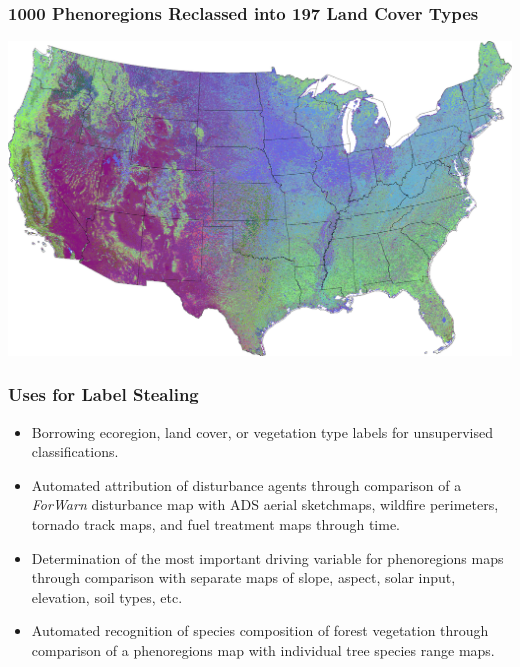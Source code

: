 \begin{frame}
 \frametitle{1000 Phenoregions Reclassed into 197 Land Cover Types}
 \includegraphics[width=\textwidth]{figures/phendump.2000-2012.1000.maxmode.reclassed_level2.simcolor_gimp.pdf}
\end{frame}


\begin{frame}
 \frametitle{Uses for Label Stealing}
 \begin{itemize}
  \item Borrowing ecoregion, land cover, or vegetation type labels for unsupervised classifications.
  \item Automated attribution of disturbance agents through comparison of a \textit{ForWarn} disturbance map with ADS aerial sketchmaps, wildfire perimeters, tornado track maps, and fuel treatment maps through time.
  \item Determination of the most important driving variable for phenoregions maps through comparison with separate maps of slope, aspect, solar input, elevation, soil types, etc.
  \item Automated recognition of species composition of forest vegetation through comparison of a phenoregions map with individual tree species range maps.
 \end{itemize}
\end{frame}

